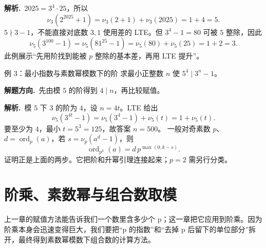 \documentclass[UTF8,a4paper,11pt,twoside,openright,fontset=fandol]{ctexbook}
\theoremstyle{definition}
\newcommand{\ord}{\operatorname{ord}}
\newcommand{\sol}{\par\noindent\textbf{解析.}\ }
\newcommand{\hint}{\par\noindent\textbf{解题方向.}\ }
\begin{document}
\sol $2025=3^4\cdot25$，所以
\[
\nu_3(2^{2025}+1)=\nu_3(2+1)+\nu_3(2025)=1+4=5.
\]
$5\nmid3-1$，不能直接对底数 $3,1$ 使用差的 LTE。但 $3^4-1=80$ 可被 $5$ 整除，因此
\[
\nu_5(3^{100}-1)=\nu_5(81^{25}-1)=\nu_5(80)+\nu_5(25)=1+2=3.
\]
此例展示“先用阶找到能被 $p$ 整除的基本差，再用 LTE 提升”。


\begin{problem}{例 3：最小指数与素数幂模数下的阶}
求最小正整数 $n$ 使 $5^4\mid3^n-1$。
\end{problem}
\hint 先由模 $5$ 的阶得到 $4\mid n$，再比较赋值。

\sol 模 $5$ 下 $3$ 的阶为 $4$，设 $n=4t$。LTE 给出
\[
 \nu_5(3^{4t}-1)=\nu_5(3^4-1)+\nu_5(t)=1+\nu_5(t).
\]
要至少为 $4$，最小 $t=5^3=125$，故答案 $n=500$。
一般对奇素数 $p$、$d=\ord_p(a)$，若 $s=\nu_p(a^d-1)$，则
\[
 \ord_{p^k}(a)=d\,p^{\max(0,k-s)}.
\]
证明正是上面的两步。它把阶和升幂引理连接起来；$p=2$ 需另行分类。



\chapter{阶乘、素数幂与组合数取模}
\begin{chapterintro}[章节导读]
上一章的赋值方法能告诉我们一个数里含多少个 p；这一章把它应用到阶乘。因为阶乘本身会迅速变得巨大，我们要把“p 的指数”和“去掉 p 后留下的单位部分”拆开，最终得到素数幂模数下组合数的计算方法。
\end{chapterintro}
\end{document}
